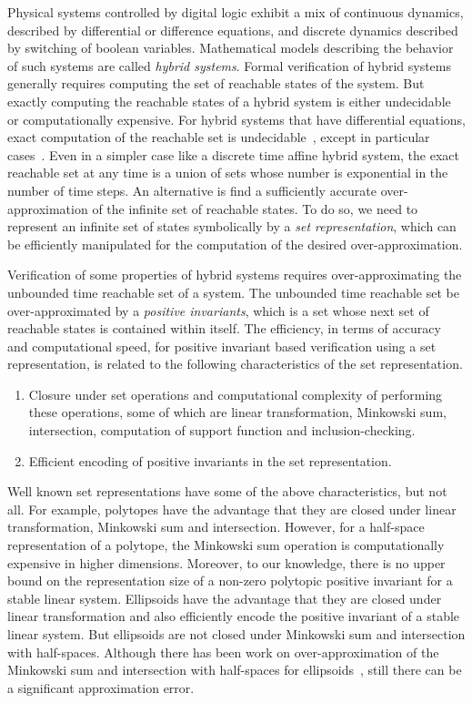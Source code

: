 
Physical systems controlled by digital logic exhibit a mix of
continuous dynamics, described by differential or difference
equations, and discrete dynamics described by switching of boolean
variables.  Mathematical models describing the behavior of such
systems are called \emph{hybrid systems}.  Formal verification of
hybrid systems generally requires computing the set of reachable
states of the system.  But exactly computing the reachable states of a
hybrid system is either undecidable or computationally expensive.  For
hybrid systems that have differential equations, exact computation of
the reachable set is undecidable~\cite{alur1995algorithmic}, except in
particular cases~\cite{lafferriere1998decidable}.  Even in a simpler
case like a discrete time affine hybrid system, the exact reachable
set at any time is a union of sets whose number is exponential
in the number of time steps.  An alternative is find a sufficiently
accurate over-approximation of the infinite set of reachable states.
To do so, we need to represent an infinite set of states symbolically
by a {\it set representation}, which can be efficiently manipulated
for the computation of the desired over-approximation.


Verification of some properties of hybrid systems requires
over-approximating the unbounded time reachable set of a system.  The
unbounded time reachable set be over-approximated by
a \emph{positive invariants}, which is a set whose next set of
reachable states is contained within itself.  The efficiency, in terms
of accuracy and computational speed, for positive
invariant based verification using a set representation, is related
to the following characteristics of the set representation.
%
\begin{enumerate}
\item Closure under set operations and computational complexity of
performing these operations, some of which are linear transformation,
Minkowski sum, intersection, computation of support function and
inclusion-checking.
\item Efficient encoding of positive invariants in the set representation.
\end{enumerate}
%
Well known set representations have some of the above characteristics,
but not all.  For example, polytopes have the advantage that they are
closed under linear transformation, Minkowski sum and intersection.
However, for a half-space representation of a polytope, the Minkowski
sum operation is computationally expensive in higher dimensions.
Moreover, to our knowledge, there is no upper bound on the
representation size of a non-zero polytopic positive invariant for a
stable linear system.  Ellipsoids have the advantage that they are
closed under linear transformation and also efficiently encode the
positive invariant of a stable linear system.  But ellipsoids are not
closed under Minkowski sum and intersection with half-spaces.
Although there has been work on over-approximation of the Minkowski
sum and intersection with half-spaces for
ellipsoids~\cite{allamigeon2017fast,kurzhanskiy2006ellipsoidal}, still there can be a significant
approximation error.


